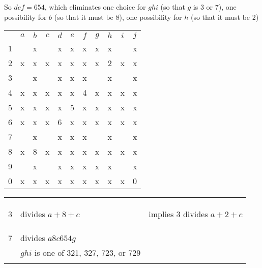 So $def=654$, which eliminates one choice for $ghi$ (so that $g$ is 3 or 7), one possibility for $b$ (so that it must be 8), one possibility for $h$ (so that it must be 2)
\begin{center}
\begin{tabular}{ccccccccccc}
			&	$a$	&	$b$	&	$c$	&	$d$	&	$e$	&	$f$	&	$g$	&	$h$	&	$i$	&	$j$	\\
	1		&		&	x	&		&	x	&	x	&	x	&	x	&	x	&		&	x	\\
	2		&	x	&	x	&	x	&	x	&	x	&	x	&	x	&	2	&	x	&	x	\\
	3		&		&	x	&		&	x	&	x	&	x	&		&	x	&		&	x	\\
	4		&	x	&	x	&	x	&	x	&	x	&	4	&	x	&	x	&	x	&	x	\\
	5		&	x	&	x	&	x	&	x	&	5	&	x	&	x	&	x	&	x	&	x	\\
	6		&	x	&	x	&	x	&	6	&	x	&	x	&	x	&	x	&	x	&	x	\\
	7		&		&	x	&		&	x	&	x	&	x	&		&	x	&		&	x	\\
	8		&	x	&	8	&	x	&	x	&	x	&	x	&	x	&	x	&	x	&	x	\\
	9		&		&	x	&		&	x	&	x	&	x	&	x	&	x	&		&	x	\\
	0		&	x	&	x	&	x	&	x	&	x	&	x	&	x	&	x	&	x	&	0	\\
\end{tabular}
\hspace{1cm}\vline\hspace{1cm}
\begin{tabular}{rll}
	& 		\\
	& 		\\
	& 		\\
	3	&	divides $a+8+c$		& implies 3 divides $a+2+c$\\
	& 		\\
	&		\\
	&		\\
	7	&	divides $a8c654g$	\\
		&	$ghi$ is one of 321, 327, 723, or 729 \\
		&	
		&	
\end{tabular}
\end{center}

